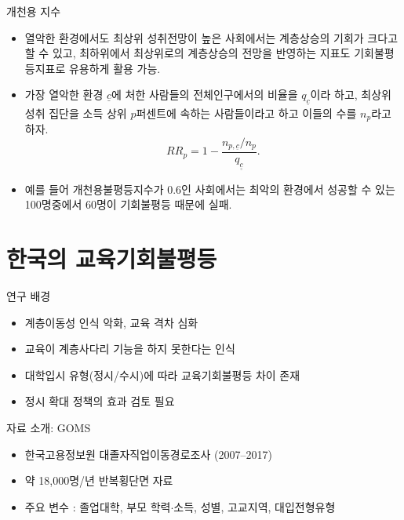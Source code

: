 \documentclass[aspectratio=169,xcolor=dvipsnames,handout]{beamer}
\begin{document}
\begin{frame}{개천용 지수}
  \begin{itemize}
        \item 열악한 환경에서도 최상위 성취전망이 높은 사회에서는 계층상승의 기회가 크다고 할 수 있고, 최하위에서 최상위로의 계층상승의 전망을 반영하는 지표도 기회불평등지표로 유용하게 활용 가능.
        \item 가장 열악한 환경 $\underline{c}$에 처한 사람들의 전체인구에서의 비율을 $q_{\underline{c}}$이라 하고, 최상위 성취 집단을 소득 상위 $p$퍼센트에 속하는 사람들이라고 하고 이들의 수를 $n_p$라고 하자.
        \begin{equation}
            R R_{p}=1-\frac{n_{p, \underline{c}} / n_{p}}{q_{\underline{\underline{c}}}}.
            \label{eq:goms_RRI}
        \end{equation}
        \item 예를 들어 개천용불평등지수가 0.6인 사회에서는 최악의 환경에서 성공할 수 있는 100명중에서 60명이 기회불평등 때문에 실패.
    \end{itemize}
\end{frame}

\section{한국의 교육기회불평등}%
\begin{frame}{연구 배경}
  \begin{itemize}
    \item 계층이동성 인식 악화, 교육 격차 심화 
    \item 교육이 계층사다리 기능을 하지 못한다는 인식
    \item 대학입시 유형(정시/수시)에 따라 교육기회불평등 차이 존재
    \item 정시 확대 정책의 효과 검토 필요
  \end{itemize}
\end{frame}

\begin{frame}{자료 소개: GOMS}
  \begin{itemize}
    \item 한국고용정보원 대졸자직업이동경로조사 (2007--2017)
    \item 약 18,000명/년 반복횡단면 자료
    \item 주요 변수 : 졸업대학, 부모 학력$\cdot$소득, 성별, 고교지역, 대입전형유형
  \end{itemize}
\end{frame}
\end{document}
